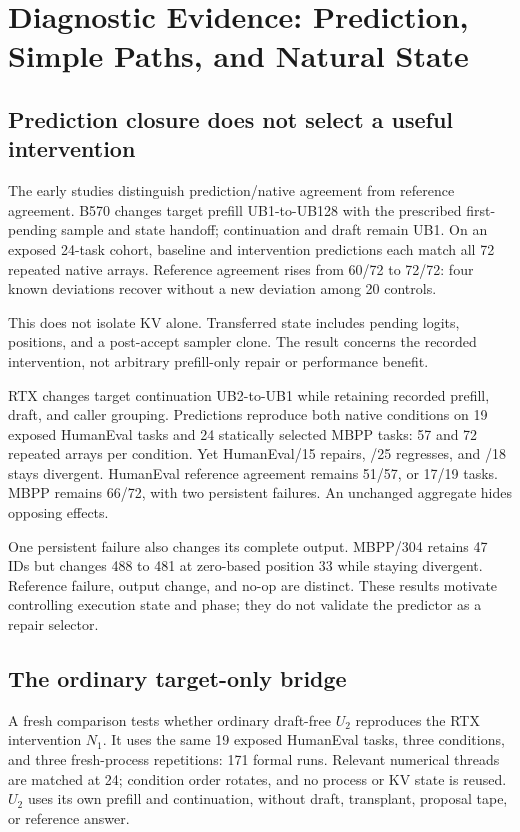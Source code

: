 \section{Diagnostic Evidence: Prediction, Simple Paths, and Natural State}
\label{sec:early}
\subsection{Prediction closure does not select a useful intervention}
The early studies distinguish prediction/native agreement from reference agreement. B570 changes target prefill UB1-to-UB128 with the prescribed first-pending sample and state handoff; continuation and draft remain UB1. On an exposed 24-task cohort, baseline and intervention predictions each match all 72 repeated native arrays. Reference agreement rises from 60/72 to 72/72: four known deviations recover without a new deviation among 20 controls.

This does not isolate KV alone. Transferred state includes pending logits, positions, and a post-accept sampler clone. The result concerns the recorded intervention, not arbitrary prefill-only repair or performance benefit.

RTX changes target continuation UB2-to-UB1 while retaining recorded prefill, draft, and caller grouping. Predictions reproduce both native conditions on 19 exposed HumanEval tasks and 24 statically selected MBPP tasks: 57 and 72 repeated arrays per condition. Yet HumanEval/15 repairs, /25 regresses, and /18 stays divergent. HumanEval reference agreement remains 51/57, or 17/19 tasks. MBPP remains 66/72, with two persistent failures. An unchanged aggregate hides opposing effects.

One persistent failure also changes its complete output. MBPP/304 retains 47 IDs but changes 488 to 481 at zero-based position 33 while staying divergent. Reference failure, output change, and no-op are distinct. These results motivate controlling execution state and phase; they do not validate the predictor as a repair selector.

\subsection{The ordinary target-only bridge}
A fresh comparison tests whether ordinary draft-free $U_2$ reproduces the RTX intervention $N_1$. It uses the same 19 exposed HumanEval tasks, three conditions, and three fresh-process repetitions: 171 formal runs. Relevant numerical threads are matched at 24; condition order rotates, and no process or KV state is reused. $U_2$ uses its own prefill and continuation, without draft, transplant, proposal tape, or reference answer.

